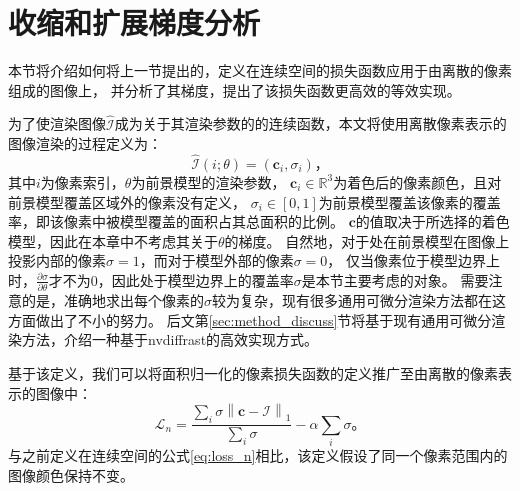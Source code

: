 \section{收缩和扩展梯度分析}

本节将介绍如何将上一节提出的，定义在连续空间的损失函数应用于由离散的像素组成的图像上，
并分析了其梯度，提出了该损失函数更高效的等效实现。

为了使渲染图像$\hat{\mathcal{I}}$成为关于其渲染参数的的连续函数，本文将使用离散像素表示的图像渲染的过程定义为：
\begin{equation}
\hat{\mathcal{I}}(i;\theta) = (\mathbf{c}_i, \sigma_i)
\text{，}
\label{eq:rendering}
\end{equation}
其中$i$为像素索引，$\theta$为前景模型的渲染参数，
$\mathbf{c}_i\in\mathbb{R}^3$为着色后的像素颜色，且对前景模型覆盖区域外的像素没有定义，
$\sigma_i\in[0,1]$为前景模型覆盖该像素的覆盖率，即该像素中被模型覆盖的面积占其总面积的比例。
$\mathbf{c}$的值取决于所选择的着色模型，因此在本章中不考虑其关于$\theta$的梯度。
自然地，对于处在前景模型在图像上投影内部的像素$\sigma=1$，而对于模型外部的像素$\sigma=0$，
仅当像素位于模型边界上时，$\frac{\partial\sigma}{\partial\theta}$才不为0，因此处于模型边界上的覆盖率$\sigma$是本节主要考虑的对象。
需要注意的是，准确地求出每个像素的$\sigma$较为复杂，现有很多通用可微分渲染方法都在这方面做出了不小的努力。
后文第\ref{sec:method_discuss}节将基于现有通用可微分渲染方法，介绍一种基于nvdiffrast的高效实现方式。

基于该定义，我们可以将面积归一化的像素损失函数的定义推广至由离散的像素表示的图像中：
\begin{equation}
\mathcal{L}_n = \frac{\sum_{i} \sigma \left\| \mathbf{c} - \mathcal{I} \right\|_1}
{\sum_{i} \sigma} - \alpha \sum_{i} \sigma
\text{。}
\label{eq:loss_n_pixel}
\end{equation}
与之前定义在连续空间的公式\eqref{eq:loss_n}相比，该定义假设了同一个像素范围内的图像颜色保持不变。

